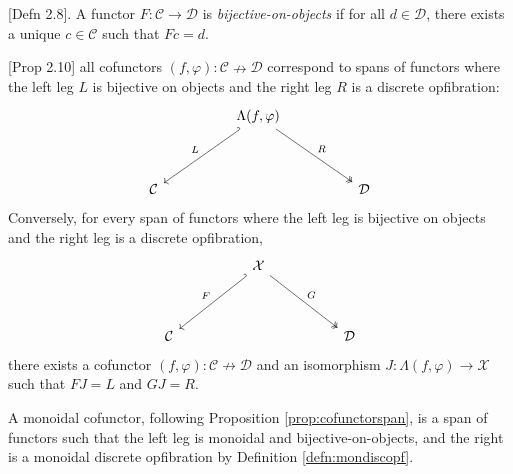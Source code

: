 
\begin{defn}\label{defn:bijonobj}
[Defn 2.8]. A functor $F: \mathcal{C} \rightarrow \mathcal{D}$ is \emph{bijective-on-objects} if for all $d \in \mathcal{D}$, there exists a unique $c \in \mathcal{C}$ such that $Fc = d$.
\end{defn}

\begin{proposition}\label{prop:cofunctorspan}
[Prop 2.10] all cofunctors $(f,\varphi):\mathcal{C} \nrightarrow \mathcal{D}$ correspond to spans of functors where the left leg $L$ is bijective on objects and the right leg $R$ is a discrete opfibration:
\[\begin{tikzcd}[ampersand replacement=\&]
	\&\& {\Lambda(f,\varphi)} \\
	\\
	{\mathcal{C}} \&\&\&\& {\mathcal{D}}
	\arrow["L"', hook', from=1-3, to=3-1]
	\arrow["R", two heads, from=1-3, to=3-5]
\end{tikzcd}\]
Conversely, for every span of functors where the left leg is bijective on objects and the right leg is a discrete opfibration,
\[\begin{tikzcd}[ampersand replacement=\&]
	\&\& {\mathcal{X}} \\
	\\
	{\mathcal{C}} \&\&\&\& {\mathcal{D}}
	\arrow["F"', hook', from=1-3, to=3-1]
	\arrow["G", two heads, from=1-3, to=3-5]
\end{tikzcd}\]
there exists a cofunctor $(f,\varphi):\mathcal{C} \nrightarrow \mathcal{D}$ and an isomorphism $J: \Lambda(f,\varphi) \rightarrow \mathcal{X}$ such that $FJ = L$ and $GJ = R$.
\end{proposition}

\begin{defn}
A monoidal cofunctor, following Proposition \ref{prop:cofunctorspan}, is a span of functors such that the left leg is monoidal and bijective-on-objects, and the right is a monoidal discrete opfibration by Definition \ref{defn:mondiscopf}.
\end{defn}

